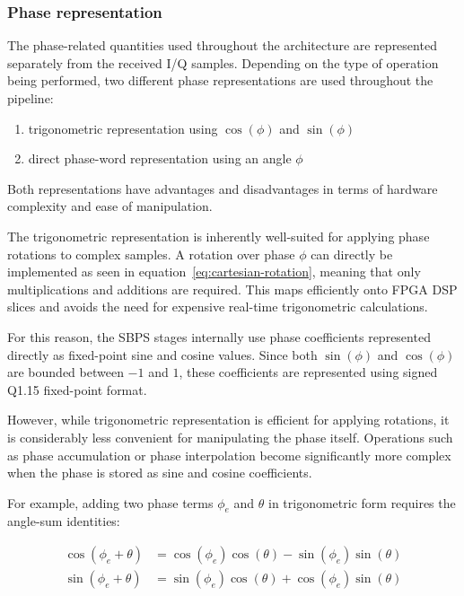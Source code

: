 
\subsubsection{Phase representation}

The phase-related quantities used throughout the architecture are represented separately from the received \ac{I/Q} samples. 
Depending on the type of operation being performed, two different phase representations are used throughout the pipeline:

\begin{enumerate}
    \item trigonometric representation using $\cos(\phi)$ and $\sin(\phi)$
    \item direct phase-word representation using an angle $\phi$
\end{enumerate}

Both representations have advantages and disadvantages in terms of hardware complexity and ease of manipulation.

The trigonometric representation is inherently well-suited for applying phase rotations to complex samples. 
A rotation over phase $\phi$ can directly be implemented as seen in equation~\ref{eq:cartesian-rotation},
meaning that only multiplications and additions are required. This maps efficiently onto FPGA DSP slices and avoids the need 
for expensive real-time trigonometric calculations.

For this reason, the \ac{SBPS} stages internally use phase coefficients represented directly as fixed-point sine and cosine values. 
Since both $\sin(\phi)$ and $\cos(\phi)$ are bounded between $-1$ and $1$, these coefficients are represented using signed Q1.15 
fixed-point format.

However, while trigonometric representation is efficient for applying rotations, it is considerably less convenient for manipulating 
the phase itself. Operations such as phase accumulation or phase interpolation become significantly more complex when the phase is stored 
as sine and cosine coefficients.

For example, adding two phase terms $\phi_e$ and $\theta$ in trigonometric form requires the angle-sum identities:

\begin{align}
    \cos(\phi_e + \theta)
    &= \cos(\phi_e)\cos(\theta) - \sin(\phi_e)\sin(\theta)
    \\
    \sin(\phi_e + \theta)
    &= \sin(\phi_e)\cos(\theta) + \cos(\phi_e)\sin(\theta)
\end{align}

